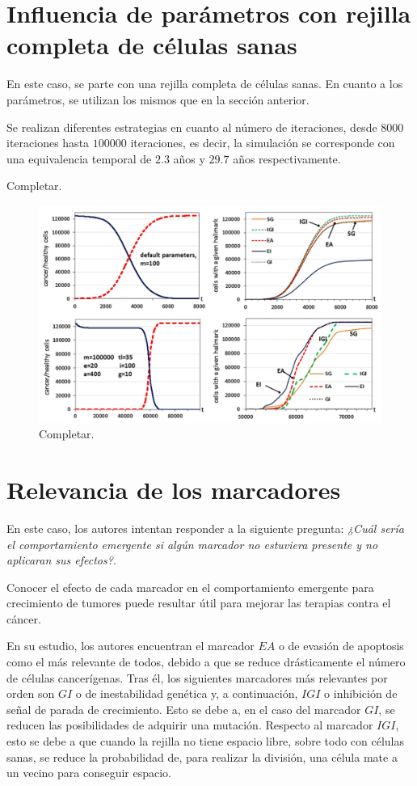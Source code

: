 \section{Influencia de parámetros con rejilla completa de células sanas}

En este caso, se parte con una rejilla completa de células sanas. En cuanto a los parámetros,
se utilizan los mismos que en la sección anterior.

Se realizan diferentes estrategias en cuanto al número de iteraciones, desde $8000$ iteraciones
hasta $100000$ iteraciones, es decir, la simulación se corresponde con una equivalencia temporal
de $2.3$ años y $29.7$ años respectivamente.

Completar.

\begin{figure}[h]
\centering
\includegraphics[scale=0.5]{figures/experiments/exp5}
\caption{Completar.}
\end{figure}

\section{Relevancia de los marcadores}

En este caso, los autores intentan responder a la siguiente pregunta: \textit{¿Cuál sería
el comportamiento emergente si algún marcador no estuviera presente y no aplicaran
sus efectos?}.

Conocer el efecto de cada marcador en el comportamiento emergente para crecimiento de tumores
puede resultar útil para mejorar las terapias contra el cáncer.

En su estudio, los autores encuentran el marcador $EA$ o de evasión de apoptosis como el más
relevante de todos, debido a que se reduce drásticamente el número de células cancerígenas.
Tras él, los siguientes marcadores más relevantes por orden son $GI$ o de inestabilidad genética y,
a continuación, $IGI$ o inhibición de señal de parada de crecimiento. Esto se debe a, en el caso
del marcador $GI$, se reducen las posibilidades de adquirir una mutación. Respecto al marcador $IGI$,
esto se debe a que cuando la rejilla no tiene espacio libre, sobre todo con células sanas, se reduce
la probabilidad de, para realizar la división, una célula mate a un vecino para conseguir espacio.

